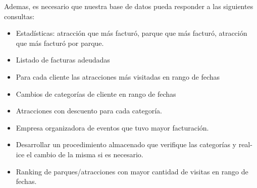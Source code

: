 Ademas, es necesario que nuestra base de datos pueda responder a las siguientes consultas:\\

\begin{itemize}
\item Estadísticas: atracción que más facturó, parque que más facturó, atracción
que más facturó por parque.
\item Listado de facturas adeudadas
\item Para cada cliente las atracciones más visitadas en rango de fechas
\item Cambios de categorías de cliente en rango de fechas
\item Atracciones con descuento para cada categoría.
\item Empresa organizadora de eventos que tuvo mayor facturación.
\item Desarrollar un procedimiento almacenado que verifique las categorías y real-
ice el cambio de la misma si es necesario.
\item Ranking de parques/atracciones con mayor cantidad de visitas en rango de
fechas.

\end{itemize}
